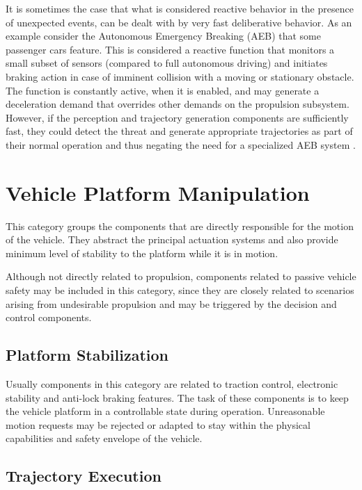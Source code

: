 It is sometimes the case that what is considered reactive behavior in the presence of unexpected events, can be dealt with by very fast deliberative behavior. As an example consider the Autonomous Emergency Breaking (AEB) that some passenger cars feature. This is considered a reactive function that monitors a small subset of sensors
(compared to full autonomous driving) and initiates braking action in case of imminent collision with a moving or stationary obstacle. The function is constantly active, when it is enabled, and may generate a deceleration demand that overrides other demands on the propulsion subsystem. However, if the perception and trajectory generation components are sufficiently fast, they could detect the threat and generate appropriate trajectories as part of their normal operation and thus negating the need for a specialized AEB system \cite{Bahere}.  

\section{Vehicle Platform Manipulation}

This category groups the components that are directly responsible for the motion of the vehicle. They abstract the principal actuation systems and also
provide minimum level of stability to the platform while it is in motion. 

Although not directly related to propulsion, components related to passive vehicle safety may be included in this category, since they are closely related to scenarios arising from undesirable propulsion and may be triggered by the decision and control components.

\subsection{Platform Stabilization}

Usually components in this category are related to traction control, electronic stability and anti-lock braking features. The task of these components is to keep the vehicle platform in a controllable state during operation. Unreasonable motion requests may be rejected or adapted to stay within the physical capabilities and safety envelope of the vehicle.

\subsection{Trajectory Execution}

